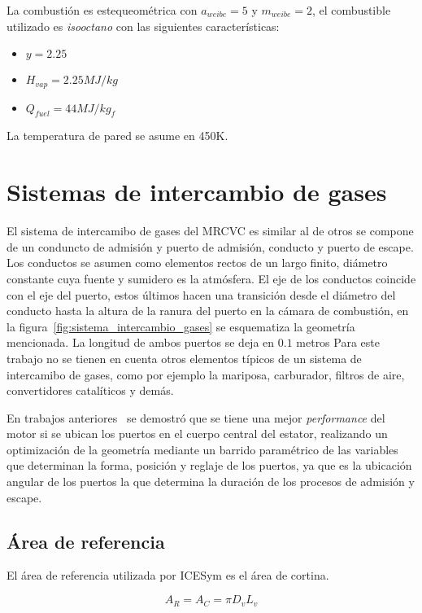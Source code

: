 La combustión es estequeométrica con $a_{weibe}=5$ y $m_{weibe}=2$, el combustible utilizado
es \emph{isooctano} con las siguientes características:
\begin{itemize}
    \item $y = 2.25$
    \item $H_{vap} = 2.25 MJ/kg$
    \item $Q_{fuel} = 44 MJ/kg_f$
\end{itemize}

La temperatura de pared se asume en 450K.


\section{Sistemas de intercambio de gases}
El sistema de intercamibo de gases del MRCVC es similar al de otros se compone
de un conduncto de admisión y puerto de admisión, conducto y puerto de escape.
%
Los conductos se asumen como elementos rectos de un largo finito, diámetro
constante cuya fuente y sumidero es la atmósfera.
%
El eje de los conductos coincide con el eje del puerto, estos últimos hacen una
transición desde el diámetro del conducto hasta la altura de la ranura del
puerto en la cámara de combustión, en la
figura~\ref{fig:sistema_intercambio_gases} se esquematiza la geometría
mencionada.
%
La longitud de ambos puertos se deja en $0.1$ metros
%
Para este trabajo no se tienen en cuenta otros elementos típicos de un sistema
de intercamibo de gases, como por ejemplo la mariposa, carburador, filtros de
aire, convertidores catalíticos y demás.

En trabajos anteriores~\cite{lopez13} se demostró que se tiene una mejor
\emph{performance} del motor si se ubican los puertos en el cuerpo central del
estator, realizando un optimización de la geometría mediante un barrido
paramétrico de las variables que determinan la forma, posición y reglaje de los
puertos, ya que es la ubicación angular de los puertos la que determina la
duración de los procesos de admisión y escape.


\subsection{Área de referencia}
%
El área de referencia utilizada por ICESym es el área de cortina.

\begin{equation}
  \label{eq:Ar}
  A_R = A_C = \pi D_v L_v
\end{equation}

